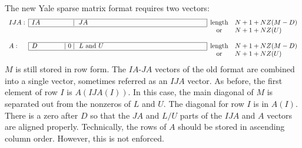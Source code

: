      The new Yale sparse matrix format \cite{NewYSMP} requires two vectors:
\[
\begin{array}{llcl}\cline{2-2}
IJA: & \multicolumn{1}{|l|}{IA\hspace{0.6in}~\mid~JA\hspace*{2.4in}}    
                              & {\rm length} & N+1+NZ(M-D)\\ \cline{2-2}
     &                        & {\rm or}     & N+1+NZ(U)\\
     &                        &              & \\ \cline{2-2}
A:   & \multicolumn{1}{|l|}{D\hspace{0.525in}\mid 0 
                                            \mid~L~{\rm and}~U\hspace*{2.1in}}    
                              & {\rm length} & N+1+NZ(M-D)\\ \cline{2-2}
     &                        & {\rm or}     & N+1+NZ(U)  
\end{array}
\]
$M$ is still stored in row form.  The $IA$-$JA$ vectors of the old
format are combined into a single vector, sometimes referred as
an $IJA$ vector.  As before, the first element of row $I$ is
$A(IJA(I))$.  In this case, the main diagonal of $M$ is separated out
from the nonzeros of $L$ and $U$.  The diagonal for row $I$ is in $A(I)$.
There is a zero after $D$ so that the $JA$ and $L/U$ parts of the $IJA$
and $A$ vectors are aligned properly.  Technically, the rows of $A$
should be stored in ascending column order.  However, this is not
enforced.
 
